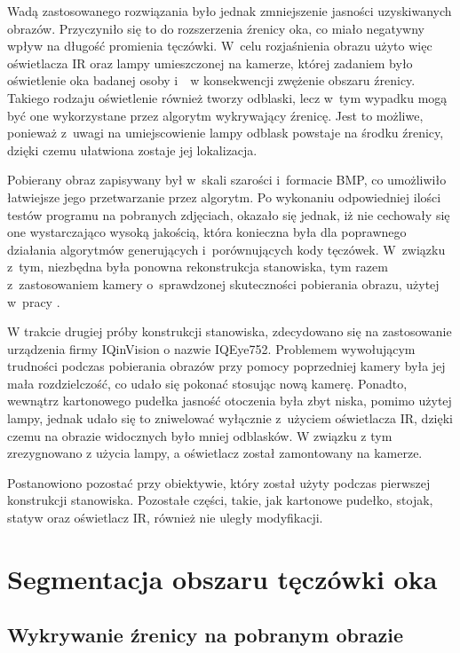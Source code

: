 Wadą zastosowanego rozwiązania było jednak zmniejszenie jasności uzyskiwanych obrazów. Przyczyniło się to do rozszerzenia źrenicy oka, co miało negatywny wpływ na długość promienia tęczówki. W~celu rozjaśnienia obrazu użyto więc oświetlacza IR oraz lampy umieszczonej na kamerze, której zadaniem było oświetlenie oka badanej osoby i~~w konsekwencji zwężenie obszaru źrenicy. Takiego rodzaju oświetlenie również tworzy odblaski, lecz w~tym wypadku mogą być one wykorzystane przez algorytm wykrywający źrenicę. Jest to możliwe, ponieważ z~uwagi na umiejscowienie lampy odblask powstaje na środku źrenicy, dzięki czemu ułatwiona zostaje jej lokalizacja.

Pobierany obraz zapisywany był w~skali szarości i~formacie BMP, co umożliwiło łatwiejsze jego przetwarzanie przez algorytm. Po wykonaniu odpowiedniej ilości testów programu na pobranych zdjęciach, okazało się jednak, iż nie cechowały się one wystarczająco wysoką jakością, która konieczna była dla poprawnego działania algorytmów generujących i~porównujących kody tęczówek. W~związku z~tym, niezbędna była ponowna rekonstrukcja stanowiska, tym razem z~zastosowaniem kamery o~sprawdzonej skuteczności pobierania obrazu, użytej w~pracy \cite{Gl11}.

W trakcie drugiej próby konstrukcji stanowiska, zdecydowano się na zastosowanie urządzenia firmy IQinVision o nazwie IQEye752. Problemem wywołującym trudności podczas pobierania obrazów przy pomocy poprzedniej kamery była jej mała rozdzielczość, co udało się pokonać stosując nową kamerę. Ponadto, wewnątrz kartonowego pudełka jasność otoczenia była zbyt niska, pomimo użytej lampy, jednak udało się to zniwelować wyłącznie z~użyciem oświetlacza IR, dzięki czemu na obrazie widocznych było mniej odblasków. W związku z tym zrezygnowano z użycia lampy, a oświetlacz został zamontowany na kamerze.

Postanowiono pozostać przy obiektywie, który został użyty podczas pierwszej konstrukcji stanowiska. Pozostałe części, takie, jak kartonowe pudełko, stojak, statyw oraz oświetlacz IR, również nie uległy modyfikacji.

\section{Segmentacja obszaru tęczówki oka}
\subsection{Wykrywanie źrenicy na pobranym obrazie}
\label{sec:wykrycieZrenicy}

